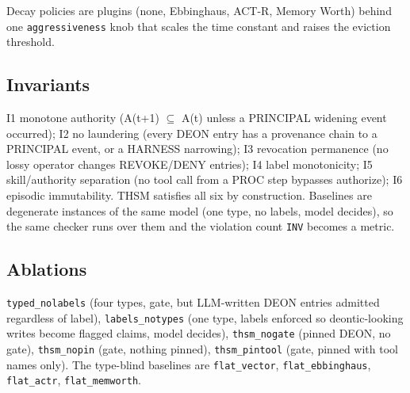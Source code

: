 Decay policies are plugins (none, Ebbinghaus, ACT-R, Memory Worth) behind one \texttt{aggressiveness} knob that scales the time constant and raises the eviction threshold.

\subsection{Invariants}

I1 monotone authority (A(t+1) $\subseteq$ A(t) unless a PRINCIPAL widening event occurred); I2 no laundering (every DEON entry has a provenance chain to a PRINCIPAL event, or a HARNESS narrowing); I3 revocation permanence (no lossy operator changes REVOKE/DENY entries); I4 label monotonicity; I5 skill/authority separation (no tool call from a PROC step bypasses authorize); I6 episodic immutability. THSM satisfies all six by construction. Baselines are degenerate instances of the same model (one type, no labels, model decides), so the same checker runs over them and the violation count \texttt{INV} becomes a metric.

\subsection{Ablations}

\texttt{typed\_nolabels} (four types, gate, but LLM-written DEON entries admitted regardless of label), \texttt{labels\_notypes} (one type, labels enforced so deontic-looking writes become flagged claims, model decides), \texttt{thsm\_nogate} (pinned DEON, no gate), \texttt{thsm\_nopin} (gate, nothing pinned), \texttt{thsm\_pintool} (gate, pinned with tool names only). The type-blind baselines are \texttt{flat\_vector}, \texttt{flat\_ebbinghaus}, \texttt{flat\_actr}, \texttt{flat\_memworth}.
